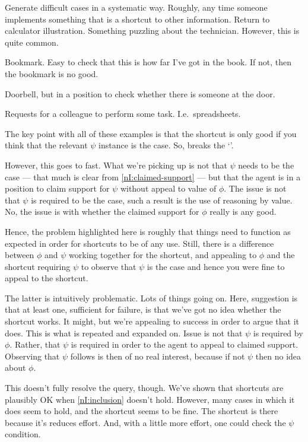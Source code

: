 \begin{note}
  Generate difficult cases in a systematic way.
  Roughly, any time someone implements something that is a shortcut to other information.
  Return to calculator illustration.
  Something puzzling about the technician.
  However, this is quite common.

  Bookmark.
  Easy to check that this is how far I've got in the book.
  If not, then the bookmark is no good.

  Doorbell, but in a position to check whether there is someone at the door.

  Requests for a colleague to perform some task.
  I.e.\ spreadsheets.

  The key point with all of these examples is that the shortcut is only good if you think that the relevant \(\psi\) instance is the case.
  So, breaks the `\eit{}'.

  However, this goes to fast.
  What we're picking up is not that \(\psi\) needs to be the case --- that much is clear from \ref{nI:claimed-support} --- but that the agent is in a position to claim support for \(\psi\) without appeal to value of \(\phi\).
  The issue is not that \(\psi\) is required to be the case, such a result is the use of reasoning by value.
  No, the issue is with whether the claimed support for \(\phi\) really is any good.

  Hence, the problem highlighted here is roughly that things need to function as expected in order for shortcuts to be of any use.
  Still, there is a difference between \(\phi\) and \(\psi\) working together for the shortcut, and appealing to \(\phi\) and the shortcut requiring \(\psi\) to observe that \(\psi\) is the case and hence you were fine to appeal to the shortcut.

  The latter is intuitively problematic.
  Lots of things going on.
  Here, suggestion is that at least one, sufficient for failure, is that we've got no idea whether the shortcut works.
  It might, but we're appealing to success in order to argue that it does.
  This is what is repeated and expanded on.
  Issue is not that \(\psi\) is required by \(\phi\).
  Rather, that \(\psi\) is required in order to the agent to appeal to claimed support.
  Observing that \(\psi\) follows is then of no real interest, because if not \(\psi\) then no idea about \(\phi\).

  This doesn't fully resolve the query, though.
  We've shown that shortcuts are plausibly OK when \ref{nI:inclusion} doesn't hold.
  However, many cases in which it does seem to hold, and the shortcut seems to be fine.
  The shortcut is there because it's reduces effort.
  And, with a little more effort, one could check the \(\psi\) condition.


\end{note}
